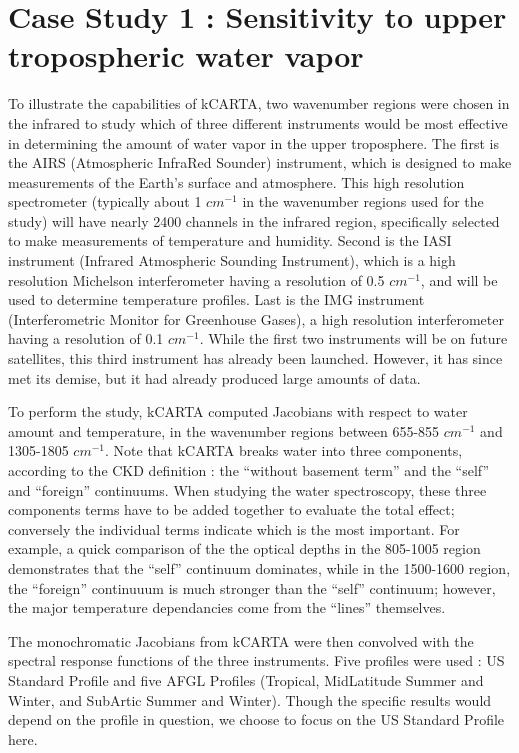 \documentclass[11pt]{article}
\begin{document}
\section{Case Study 1 : Sensitivity to upper tropospheric water vapor}
To illustrate the capabilities of \textsf{kCARTA}, two wavenumber
regions were chosen in the infrared to study which of three different 
instruments would be most effective in determining the amount of water
vapor in the upper troposphere.  The first is the AIRS (Atmospheric
InfraRed Sounder) instrument, which is designed to make measurements
of the Earth's surface and atmosphere. This high resolution
spectrometer (typically about 1 $cm^{-1}$ in the wavenumber regions
used for the study) will have nearly 2400 channels in the infrared
region, specifically selected to make measurements of temperature and
humidity. Second is the IASI instrument (Infrared Atmospheric Sounding
Instrument), which is a high resolution Michelson interferometer
having a resolution of 0.5 $cm^{-1}$, and will be used to determine
temperature profiles.  Last is the IMG instrument (Interferometric
Monitor for Greenhouse Gases), a high resolution interferometer having
a resolution of 0.1 $cm^{-1}$. While the first two instruments will be
on future satellites, this third instrument has already been launched.
However, it has since met its demise, but it had already produced
large amounts of data.

To perform the study, \textsf{kCARTA} computed Jacobians with respect to 
water amount and temperature, in the wavenumber regions between 
655-855 $cm^{-1}$ and 1305-1805 $cm^{-1}$. Note that \textsf{kCARTA} breaks 
water into three components, according to the CKD definition 
\cite{tob:95} : the ``without basement term'' and the ``self'' and 
``foreign'' continuums. 
When studying the water spectroscopy, these three components terms have to be 
added together to evaluate the total effect; conversely the individual terms 
indicate which is the most important. For example, a quick comparison of the
the optical depths in the 805-1005 \wn region demonstrates that the ``self''
continuum dominates, while in the 1500-1600 \wn region, the ``foreign'' 
continuuum is much stronger than the ``self'' continuum; however, the major
temperature dependancies come from the ``lines'' themselves.

The monochromatic Jacobians from \textsf{kCARTA} were then convolved
with the spectral response functions of the three instruments. Five
profiles were used : US Standard Profile and five AFGL Profiles
(Tropical, MidLatitude Summer and Winter, and SubArtic Summer and
Winter). Though the specific results would depend on the profile in question, 
we choose to focus on the US Standard Profile here.
\end{document}
